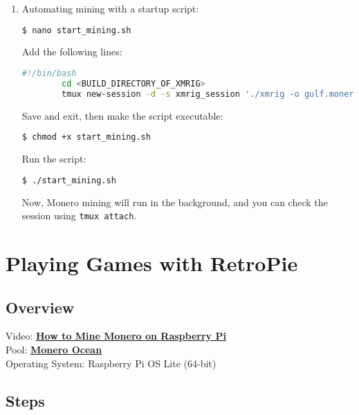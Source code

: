 \documentclass[a4paper,12pt]{article}
\begin{document}
\begin{enumerate}
\begin{enumerate}
        \item Automating mining with a startup script:
        \begin{lstlisting}[language=bash, breaklines=true, breakatwhitespace=true, columns=fullflexible]
        $ nano start_mining.sh
        \end{lstlisting}
        Add the following lines:
        \begin{lstlisting}[language=bash, breaklines=true, breakatwhitespace=true, columns=fullflexible]
        #!/bin/bash
        cd <BUILD_DIRECTORY_OF_XMRIG>
        tmux new-session -d -s xmrig_session './xmrig -o gulf.moneroocean.stream:10128 -u <YOUR_WALLET_ADDRESS> -p <WORKER_NAME>'
        \end{lstlisting}
        Save and exit, then make the script executable:
        \begin{lstlisting}[language=bash, breaklines=true, breakatwhitespace=true, columns=fullflexible]
        $ chmod +x start_mining.sh
        \end{lstlisting}
        Run the script:
        \begin{lstlisting}[language=bash, breaklines=true, breakatwhitespace=true, columns=fullflexible]
        $ ./start_mining.sh
        \end{lstlisting}
	Now, Monero mining will run in the background, and you can check the session using \texttt{tmux attach}.
    \end{enumerate}
\end{enumerate}

\section{Playing Games with RetroPie}

\subsection{Overview}
Video: \href{https://www.youtube.com/watch?v=AaseHnf0k2o}{\textbf{\color{blue}How to Mine Monero on Raspberry Pi}} \\
Pool: \href{https://moneroocean.stream/}{\textbf{\color{blue}Monero Ocean}} \\
Operating System: Raspberry Pi OS Lite (64-bit)

\subsection{Steps}
\end{document}
